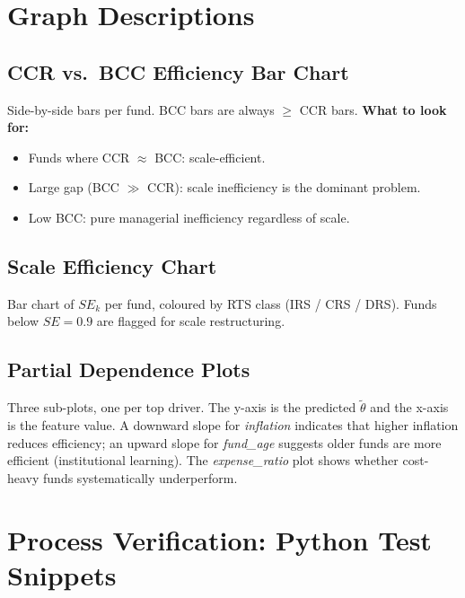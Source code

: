 \documentclass[12pt,a4paper]{article}
\begin{document}
\section{Graph Descriptions}

\subsection{CCR vs.\ BCC Efficiency Bar Chart}

Side-by-side bars per fund.  BCC bars are always $\geq$ CCR bars.
\textbf{What to look for:}
\begin{itemize}
    \item Funds where CCR $\approx$ BCC: scale-efficient.
    \item Large gap (BCC $\gg$ CCR): scale inefficiency is the dominant problem.
    \item Low BCC: pure managerial inefficiency regardless of scale.
\end{itemize}

\subsection{Scale Efficiency Chart}

Bar chart of $SE_k$ per fund, coloured by RTS class (IRS / CRS / DRS).
Funds below $SE = 0.9$ are flagged for scale restructuring.

\subsection{Partial Dependence Plots}

Three sub-plots, one per top driver.  The y-axis is the predicted
$\tilde{\theta}$ and the x-axis is the feature value.  A downward slope for
\textit{inflation} indicates that higher inflation reduces efficiency;
an upward slope for \textit{fund\_age} suggests older funds are more efficient
(institutional learning).  The \textit{expense\_ratio} plot shows whether
cost-heavy funds systematically underperform.

\section{Process Verification: Python Test Snippets}
\end{document}
